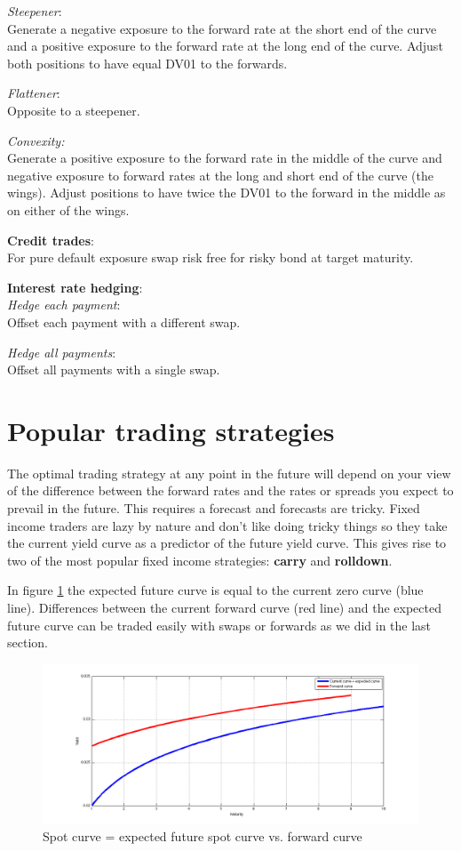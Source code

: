 \textit{Steepener}:\\ 
Generate a negative exposure to the forward rate at the short end of the curve and a positive exposure to the forward rate at the long end of the curve. Adjust both positions to have equal DV01 to the forwards.

\textit{Flattener}:\\
Opposite to a steepener.

\textit{Convexity:}\\
Generate a positive exposure to the forward rate in the middle of the curve and negative exposure to forward rates at the long and short end of the curve (the wings). Adjust positions to have twice the DV01 to the forward in the middle as on either of the wings.

\textbf{Credit trades}:\\
For pure default exposure swap risk free for risky bond at target maturity. 

\textbf{Interest rate hedging}:\\

\textit{Hedge each payment}:\\
Offset each payment with a different swap. 

\textit{Hedge all payments}:\\
Offset all payments with a single swap.


\section{Popular trading strategies}

The optimal trading strategy at any point in the future will depend on your view of the difference between the forward rates and the rates or spreads you expect to prevail in the future. This requires a forecast and forecasts are tricky. Fixed income traders are lazy by nature and don't like doing tricky things so they take the current yield curve as a predictor of the future yield curve. This gives rise to two of the most popular fixed income strategies: \textbf{carry} and \textbf{rolldown}.

In figure \ref{fig:genericCurve} the expected future curve is equal to the current zero curve (blue line). Differences between the current forward curve (red line) and the expected future curve can be traded easily with swaps or forwards as we did in the last section. 

\begin{figure}[ht]
\centering
  \includegraphics[width=5in] {pics/genericCurve}
\caption{Spot curve = expected future spot curve vs. forward curve}
\label{fig:genericCurve}
\end{figure}

